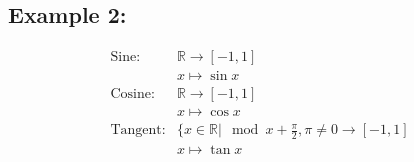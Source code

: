 \documentclass[a4paper,12pt]{article}
\begin{document}
\subsection*{Example 2:}
\begin{align*}
\text{Sine} : & \mathbb{R} \rightarrow [-1,1] \\
& x \mapsto \sin{x} \\
\text{Cosine}: & \mathbb{R} \rightarrow [-1,1] \\
& x \mapsto \cos{x} \\
\text{Tangent}: & \{ x \in \mathbb{R} \vert \mod{x + \frac{\pi}{2},\pi} \neq 0 \rightarrow [-1,1] \\
& x \mapsto \tan{x} \\
\end{align*}
\end{document}
